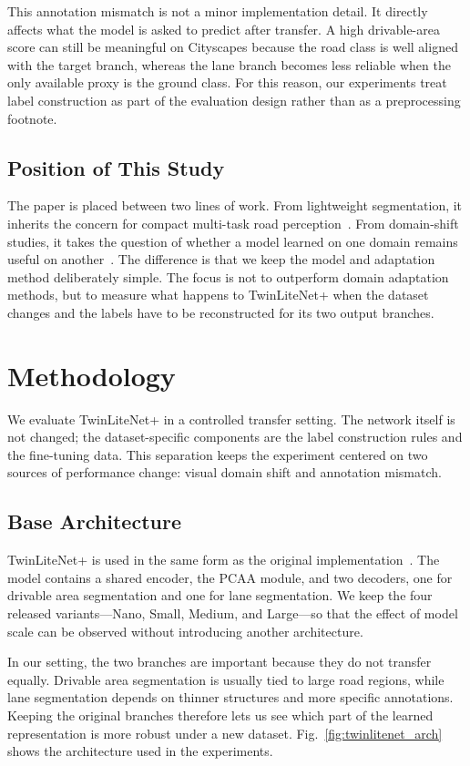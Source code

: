 \documentclass[conference]{IEEEtran}
\begin{document}
This annotation mismatch is not a minor implementation detail. It directly affects what the model is asked to predict after transfer. A high drivable-area score can still be meaningful on Cityscapes because the road class is well aligned with the target branch, whereas the lane branch becomes less reliable when the only available proxy is the ground class. For this reason, our experiments treat label construction as part of the evaluation design rather than as a preprocessing footnote.

\subsection{Position of This Study}
The paper is placed between two lines of work. From lightweight segmentation, it inherits the concern for compact multi-task road perception~\cite{ref1,ref5,ref6,ref7}. From domain-shift studies, it takes the question of whether a model learned on one domain remains useful on another~\cite{ref8,ref9,ref10}. The difference is that we keep the model and adaptation method deliberately simple. The focus is not to outperform domain adaptation methods, but to measure what happens to TwinLiteNet+ when the dataset changes and the labels have to be reconstructed for its two output branches.

\section{Methodology}
We evaluate TwinLiteNet+ in a controlled transfer setting. The network itself is not changed; the dataset-specific components are the label construction rules and the fine-tuning data. This separation keeps the experiment centered on two sources of performance change: visual domain shift and annotation mismatch.

\subsection{Base Architecture}
TwinLiteNet+ is used in the same form as the original implementation~\cite{ref1}. The model contains a shared encoder, the PCAA module, and two decoders, one for drivable area segmentation and one for lane segmentation. We keep the four released variants---Nano, Small, Medium, and Large---so that the effect of model scale can be observed without introducing another architecture.

In our setting, the two branches are important because they do not transfer equally. Drivable area segmentation is usually tied to large road regions, while lane segmentation depends on thinner structures and more specific annotations. Keeping the original branches therefore lets us see which part of the learned representation is more robust under a new dataset. Fig.~\ref{fig:twinlitenet_arch} shows the architecture used in the experiments.
\end{document}
